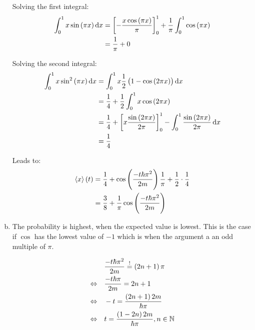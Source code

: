\documentclass[a4paper,german,12pt,smallheadings]{scrartcl}
\begin{document}
\begin{enumerate}[a)]
    Solving the first integral:
    \begin{align*}
      \int_0^1 x \sin\del{\pi x} \dif x  &= \sbr{-\frac{x\cos\del{\pi x}}{\pi}}_0^1 + \frac{1}{\pi} \int_0^1 \cos\del{\pi x} \\
                                         &= \frac{1}{\pi} + 0
    \end{align*}

    Solving the second integral:
    \begin{align*}
      \int_0^1 x \sin^2\del{\pi x} \dif x  &= \int_0^1 x \frac{1}{2} \del{1- \cos\del{2 \pi x}} \dif x \\
                                           &= \frac{1}{4} + \frac{1}{2} \int_0^1 x \cos\del{2 \pi x} \\
                                           &= \frac{1}{4} + \sbr{x \frac{\sin\del{2 \pi x}}{2 \pi}}_0^1 - \int_0^1 \frac{\sin\del{2 \pi x}}{2 \pi} \dif x \\
                                           &= \frac{1}{4}
    \end{align*}

    Leads to:
    \begin{align*}
      \braket{x}(t) &= \frac{1}{4} + \cos\del{\frac{-t \hbar \pi^2}{2m}} \frac{1}{\pi} + \frac{1}{2} \cdot \frac{1}{4} \\
                    &= \frac{3}{8} + \frac{1}{\pi} \cos\del{\frac{-t \hbar \pi^2}{2m}}
    \end{align*}
  \item
    The probability is highest, when the expected value is lowest. This is the
    case if $\cos$ has the lowest value of $-1$ which is when the argument a an
    odd multiple of $\pi$.

    \begin{align*}
      &\frac{-t \hbar \pi^2}{2m} \overset{!}{=} \del{2n + 1} \pi \\
      \Leftrightarrow\quad
      &\frac{-t \hbar \pi}{2m} = 2n + 1 \\
      \Leftrightarrow\quad
      &-t = \frac{\del{2n + 1}2m}{\hbar \pi} \\
      \Leftrightarrow\quad
      &t = \frac{\del{1-2n}2m}{\hbar \pi}, n \in \mathbb{N} \\
    \end{align*}




\end{enumerate}
\end{document}
